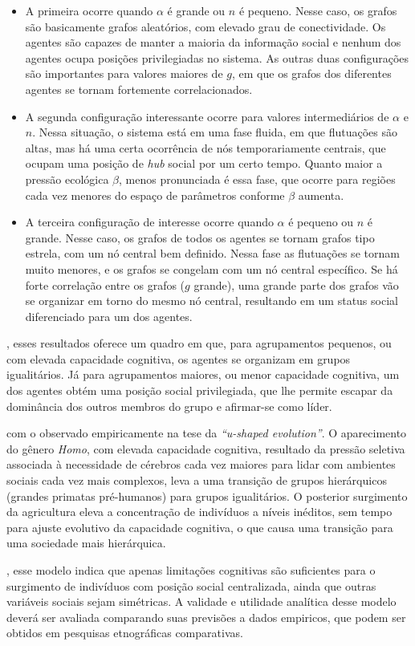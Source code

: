 \begin{itemize}
 \item A primeira ocorre quando $\alpha$ é grande ou $n$ é pequeno. Nesse caso, os grafos são basicamente grafos aleatórios, com elevado grau de conectividade. Os agentes são capazes de manter a maioria da informação social e nenhum dos agentes ocupa posições privilegiadas no sistema. As outras duas configurações são importantes para valores maiores de $g$, em que os grafos dos diferentes agentes se tornam fortemente correlacionados.
 
 \item A segunda configuração interessante ocorre para valores intermediários de $\alpha$ e $n$. Nessa situação, o sistema está em uma fase fluida, em que flutuações são altas, mas há uma certa ocorrência de nós temporariamente centrais, que ocupam uma posição de \textit{hub} social por um certo tempo. Quanto maior a pressão ecológica $\beta$, menos pronunciada é essa fase, que ocorre para regiões cada vez menores do espaço de parâmetros conforme $\beta$ aumenta.
 
 
\item  A terceira configuração de interesse ocorre quando $\alpha$ é pequeno ou $n$ é grande. Nesse caso, os grafos de todos os agentes se tornam grafos tipo estrela, com um nó central bem definido. Nessa fase as flutuações se tornam muito menores, e os grafos se congelam com um nó central específico. Se há forte correlação entre os grafos ($g$ grande), uma grande parte dos grafos vão se organizar em torno do mesmo nó central, resultando em um status social diferenciado para um dos agentes. 
\end{itemize}

, esses resultados oferece um quadro em que, para agrupamentos pequenos, ou com elevada capacidade cognitiva, os agentes se organizam em grupos igualitários. Já para agrupamentos maiores, ou menor capacidade cognitiva, um dos agentes obtém uma posição social privilegiada, que lhe permite escapar da dominância dos outros membros do grupo e afirmar-se como líder. 

 com o observado empiricamente na tese da \textit{``u-shaped evolution''}. O aparecimento do gênero \textit{Homo}, com elevada capacidade cognitiva, resultado da pressão seletiva associada à necessidade de cérebros cada vez maiores para lidar com ambientes sociais cada vez mais complexos, leva a uma transição de grupos hierárquicos (grandes primatas pré-humanos) para grupos igualitários. O posterior surgimento da agricultura eleva a concentração de indivíduos a níveis inéditos, sem tempo para ajuste evolutivo da capacidade cognitiva, o que causa uma transição para uma sociedade mais hierárquica. 

, esse modelo indica que apenas limitações cognitivas são suficientes para o surgimento de indivíduos com posição social centralizada, ainda que outras variáveis sociais sejam simétricas. A validade e utilidade analítica desse modelo deverá ser avaliada comparando suas previsões a dados empiricos, que podem ser obtidos em pesquisas etnográficas comparativas. 